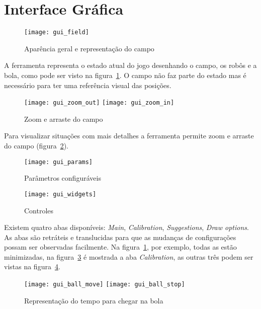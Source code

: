 \section{Interface Gráfica}\label{sec:gui}

\FloatBarrier

\begin{figure}[h]
  \centering
  \texttt{[image: gui\_field]}
  \caption{Aparência geral e representação do campo}\label{fig:gui_field}
\end{figure}

A ferramenta representa o estado atual do jogo desenhando o campo, os robôs e a
bola, como pode ser visto na figura~\ref{fig:gui_field}.  O campo não faz parte
do estado mas é necessário para ter uma referência visual das posições.

\begin{figure}[h]
  \centering
  \texttt{[image: gui\_zoom\_out]}
  \texttt{[image: gui\_zoom\_in]}
  \caption{Zoom e arraste do campo}\label{fig:gui_zoom}
\end{figure}

Para visualizar situações com mais detalhes a ferramenta permite zoom e arraste
do campo (figura~\ref{fig:gui_zoom}).

\FloatBarrier

\begin{figure}[h]
  \centering
  \texttt{[image: gui\_params]}
  \caption{Parâmetros configuráveis}\label{fig:gui_params}
\end{figure}

\begin{figure}[h]
  \centering
  \texttt{[image: gui\_widgets]}
  \caption{Controles}\label{fig:gui_widgets}
\end{figure}

\FloatBarrier

Existem quatro abas disponíveis: \textit{Main}, \textit{Calibration},
\textit{Suggestions}, \textit{Draw options}. As abas são retráteis e
translucidas para que as mudanças de configurações possam ser observadas
facilmente.  Na figura~\ref{fig:gui_field}, por exemplo, todas as estão
minimizadas, na figura~\ref{fig:gui_params} é mostrada a aba
\textit{Calibration}, as outras três podem ser vistas na
figura~\ref{fig:gui_widgets}.

\begin{figure}[h]
  \centering
  \texttt{[image: gui\_ball\_move]}
  \texttt{[image: gui\_ball\_stop]}
  \caption{Representação do tempo para chegar na bola}\label{fig:gui_ball}
\end{figure}

